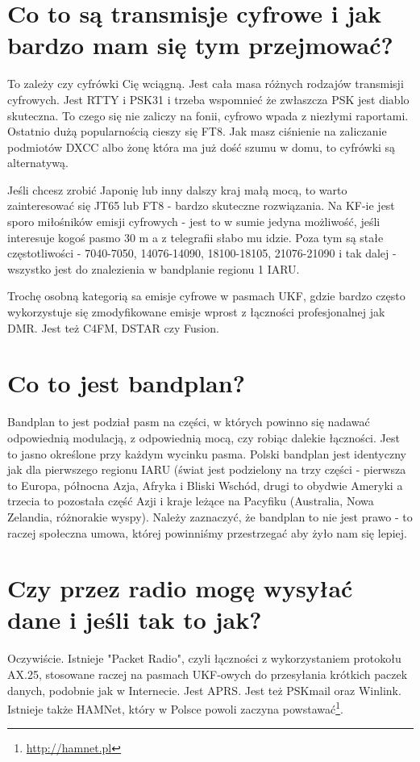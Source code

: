 \documentclass[a4paper,12pt]{article}
\begin{document}
\section{Co to są transmisje cyfrowe i jak bardzo mam się tym przejmować?}
To zależy czy cyfrówki Cię wciągną. 
Jest cała masa różnych rodzajów transmisji cyfrowych. Jest RTTY i PSK31 i trzeba wspomnieć że zwłaszcza PSK jest diablo skuteczna. To czego się nie zaliczy na fonii, cyfrowo wpada z niezłymi raportami. Ostatnio dużą popularnością cieszy się FT8.
Jak masz ciśnienie na zaliczanie podmiotów DXCC albo żonę która ma już dość szumu w domu, to cyfrówki są alternatywą.

Jeśli chcesz zrobić Japonię lub inny dalszy kraj małą mocą, to warto zainteresować się JT65 lub FT8 - bardzo skuteczne rozwiązania. Na KF-ie jest sporo miłośników emisji cyfrowych - jest to w sumie jedyna możliwość, jeśli interesuje kogoś pasmo 30 m a z telegrafii słabo mu idzie. Poza tym są stałe częstotliwości - 7040-7050, 14076-14090, 18100-18105, 21076-21090 i tak dalej - wszystko jest do znalezienia w bandplanie regionu 1 IARU.

Trochę osobną kategorią sa emisje cyfrowe w pasmach UKF, gdzie bardzo często wykorzystuje się zmodyfikowane emisje wprost z łączności profesjonalnej jak DMR. Jest też C4FM, DSTAR czy Fusion.

\section{Co to jest bandplan?}
Bandplan to jest podział pasm na części, w których powinno się nadawać odpowiednią modulacją, z odpowiednią mocą, czy robiąc dalekie łączności. Jest to jasno określone przy każdym wycinku pasma. 
Polski bandplan jest identyczny jak dla pierwszego regionu IARU (świat jest podzielony na trzy części - pierwsza to Europa, północna Azja, Afryka i Bliski Wschód, drugi to obydwie Ameryki a trzecia to pozostała część Azji i kraje leżące na Pacyfiku (Australia, Nowa Zelandia, różnorakie wyspy). Należy zaznaczyć, że bandplan to nie jest prawo - to raczej społeczna umowa, której powinniśmy przestrzegać aby żyło nam się lepiej. 

\section{Czy przez radio mogę wysyłać dane i jeśli tak to jak?}
Oczywiście. Istnieje "Packet Radio", czyli łączności z wykorzystaniem protokołu AX.25, stosowane raczej na pasmach UKF-owych do przesyłania krótkich paczek danych, podobnie jak w Internecie.
Jest APRS.
Jest też PSKmail oraz Winlink.
Istnieje także HAMNet, który w Polsce powoli zaczyna powstawać\footnote{\url{http://hamnet.pl}}.
\end{document}
